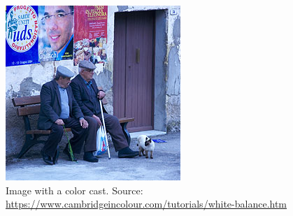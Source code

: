 \documentclass[10pt,letterpaper]{article}
\begin{document}
\begin{figure}[h]
\centering
\includegraphics[scale=1]{../data/wb_sardmen-incorrect.jpg}
\caption{Image with a color cast. Source: \url{https://www.cambridgeincolour.com/tutorials/white-balance.htm}}
\label{fig:color}
\end{figure}
\end{document}
